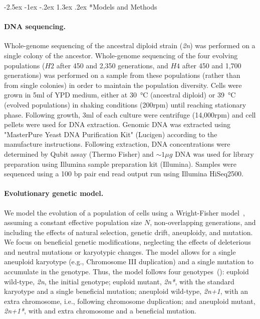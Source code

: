 \documentclass[12pt]{extarticle}
\makeatletter
\renewcommand\section{\@startsection {section}{1}{\z@}%
     {-2.5ex \@plus -1ex \@minus -.2ex}%
     {1.3ex \@plus.2ex}%
    {\Large\bfseries}}
\newcommand{\euwt}{\emph{2n}}
\newcommand{\anwt}{\emph{2n+1}}
\newcommand{\eumt}{\emph{2n*}}
\newcommand{\anmt}{\emph{2n+1*}}
\makeatother
\begin{document}
\section*{Models and Methods}

\paragraph{DNA sequencing.}
Whole-genome sequencing of the ancestral diploid strain (\euwt) was performed
on a single colony of the ancestor. Whole-genome sequencing of the four evolving populations ($H2$ after 450 and 2,350 generations, and $H4$ after 450 and 1,700 generations) was performed on a sample from these populations (rather than from single colonies) in order to maintain the population diversity. Cells were grown in 5ml of YPD medium, either at \SI{30}{\celsius} (ancestral diploid) or \SI{39}{\celsius} (evolved populations) in shaking conditions (200rpm) until reaching stationary phase. Following growth, 3ml of each culture were centrifuge (14,000rpm) and cell pellets were used for DNA extraction. 
Genomic DNA was extracted using "MasterPure Yeast DNA Purification Kit" (Lucigen) according to the manufacture instructions. Following extraction, DNA concentrations were determined by Qubit assay (Thermo Fisher) and $\sim1\mu g$ DNA was used for library preparation using Illumina sample preparation kit (Illumina). Samples were sequenced using a 100 bp pair end read output run using Illumina HiSeq2500.  

\paragraph{Evolutionary genetic model.}
We model the evolution of a population of cells using a Wright-Fisher model~\citep{Otto2007}, assuming a constant effective population size $N$, non-overlapping generations, and including the effects of natural selection, genetic drift, aneuploidy, and mutation. 
We focus on beneficial genetic modifications, neglecting the effects of deleterious and neutral mutations or karyotypic changes.
The model allows for a single aneuploid karyotype (e.g., Chromosome III duplication) and a single mutation to accumulate in the genotype.
Thus, the model follows four genotypes~(): euploid wild-type, \euwt, the initial genotype; 
euploid mutant, \eumt, with the standard karyotype and a single beneficial mutation; 
aneuploid wild-type, \anwt, with an extra chromosome, i.e., following chromosome duplication; and
aneuploid mutant, \anmt, with and extra chromosome and a beneficial mutation. 
\end{document}
